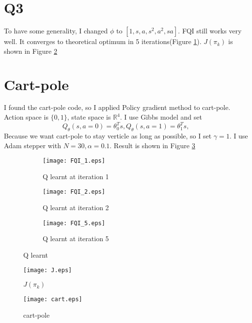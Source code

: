 \documentclass{article}
\begin{document}
	\section*{Q3}
	To have some generality, I changed $\phi$ to $[1,s,a,s^2, a^2, sa]$. FQI still works very well. It converges to theoretical optimum in 5 iterations(Figure \ref{fig:fqi}). $J(\pi_k)$ is shown in Figure \ref{fig:J}
	
	\section*{Cart-pole}
	I found the cart-pole code, so I applied Policy gradient method to cart-pole. Action space is $\{0,1\}$, state space is $\mathbb{R}^4$. I use Gibbs model and set 
	$$
	Q_\theta(s,a=0)= \theta_0^T s, Q_\theta(s,a=1)= \theta_1^T s, 
	$$
	Because we want cart-pole to stay verticle as long as possible, so I set $\gamma=1$. I use Adam stepper with $N=30, \alpha=0.1$. Result is shown in Figure \ref{fig:cart}
	
\begin{figure}
	\centering
	\begin{subfigure}[b]{0.32\textwidth}
		\centering
		\texttt{[image: FQI\_1.eps]}
		\caption{Q learnt at iteration 1}
	\end{subfigure}
	\begin{subfigure}[b]{0.32\textwidth}
		\centering
		\texttt{[image: FQI\_2.eps]}
		\caption{Q learnt at iteration 2}
	\end{subfigure}
	\begin{subfigure}[b]{0.32\textwidth}
		\centering
		\texttt{[image: FQI\_5.eps]}
		\caption{Q learnt at iteration 5}
	\end{subfigure}
	\caption{Q learnt}
	\label{fig:fqi}
\end{figure}
\begin{figure}
	\centering
		\texttt{[image: J.eps]}
	\caption{$J(\pi_k)$}
	\label{fig:J}
\end{figure}
\begin{figure}
	\centering
	\texttt{[image: cart.eps]}
	\caption{cart-pole}
	\label{fig:cart}
\end{figure}
\end{document}
